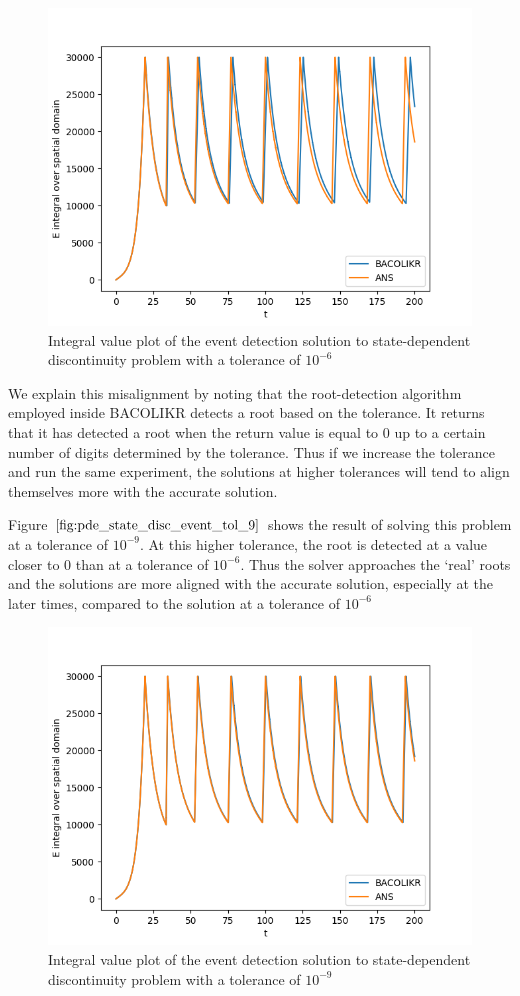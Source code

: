 \documentclass{article}
\begin{document}
\begin{figure}[H]
\centering
\includegraphics[width=0.7\linewidth]{./figures/pde_state_disc_event_tol_6}
\caption{Integral value plot of the event detection solution to state-dependent discontinuity problem with a tolerance of $10^{-6}$}
\label{fig:pde_state_disc_event_tol_6}
\end{figure}

We explain this misalignment by noting that the root-detection algorithm employed inside BACOLIKR detects a root based on the tolerance. It returns that it has detected a root when the return value is equal to 0 up to a certain number of digits determined by the tolerance. Thus if we increase the tolerance and run the same experiment, the solutions at higher tolerances will tend to align themselves more with the accurate solution.

Figure $\ref{fig:pde_state_disc_event_tol_9}$ shows the result of solving this problem at a tolerance of $10^{-9}$. At this higher tolerance, the root is detected at a value closer to 0 than at a tolerance of $10^{-6}$. Thus the solver approaches the `real' roots and the solutions are more aligned with the accurate solution, especially at the later times, compared to the solution at a tolerance of $10^{-6}$


\begin{figure}[H]
\centering
\includegraphics[width=0.7\linewidth]{./figures/pde_state_disc_event_tol_9}
\caption{Integral value plot of the event detection solution to state-dependent discontinuity problem with a tolerance of $10^{-9}$}
\label{fig:pde_state_disc_event_tol_9}
\end{figure}
\end{document}
